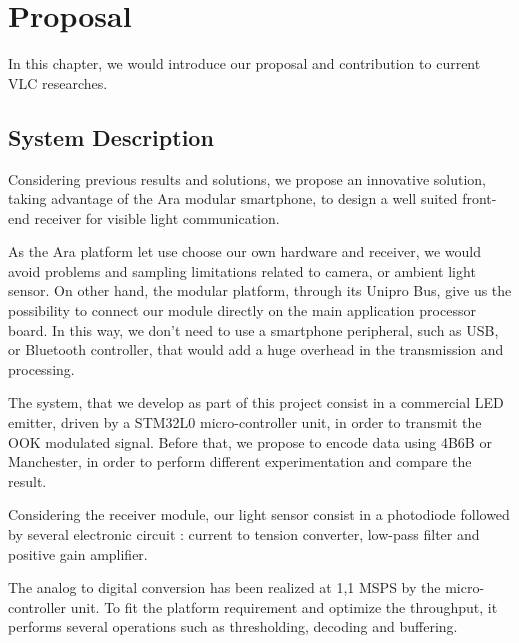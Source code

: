
\chapter{Proposal} %

\label{Proposal} %


In this chapter, we would introduce our proposal and contribution to current VLC researches. 


\section{System Description}


Considering previous results and solutions, we propose an innovative solution, taking advantage of the Ara modular smartphone,
to design a well suited front-end receiver for visible light communication.

As the Ara platform let use choose our own hardware and receiver, we would avoid problems and sampling limitations related to camera, or ambient light sensor.
On other hand, the modular platform, through its Unipro Bus, give us the possibility to connect our module directly on the  main application processor board.
In this way, we don't need to use a smartphone peripheral, such as USB, or Bluetooth controller, that would add a huge overhead in the transmission and processing.

The system, that we develop as part of this project consist in a commercial LED emitter, driven by a STM32L0 micro-controller unit, in order to transmit the OOK modulated signal. Before that, we propose to encode data using 4B6B or Manchester, in order to perform different experimentation and compare the result.

Considering the receiver module, our light sensor consist in a photodiode followed by several electronic circuit : current to tension converter, low-pass filter and positive gain amplifier.

The analog to digital conversion has been realized at 1,1 MSPS by the micro-controller unit. To fit the platform requirement and optimize the throughput, it performs several operations such as thresholding, decoding and buffering.

